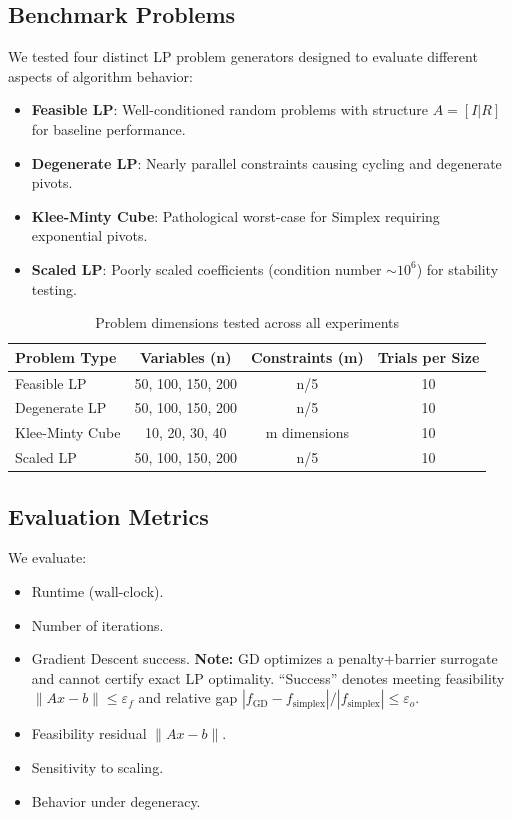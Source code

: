 \documentclass[11pt]{article}
\begin{document}
\subsection{Benchmark Problems}
We tested four distinct LP problem generators designed to evaluate different aspects of algorithm behavior:
\begin{itemize}
    \item \textbf{Feasible LP}: Well-conditioned random problems with structure \(A = [I | R]\) for baseline performance.
    \item \textbf{Degenerate LP}: Nearly parallel constraints causing cycling and degenerate pivots.
    \item \textbf{Klee-Minty Cube}: Pathological worst-case for Simplex requiring exponential pivots.
    \item \textbf{Scaled LP}: Poorly scaled coefficients (condition number \(\sim 10^6\)) for stability testing.
\end{itemize}

\begin{table}[h]
\centering
\caption{Problem dimensions tested across all experiments}
\begin{tabular}{lccc}
\toprule
\textbf{Problem Type} & \textbf{Variables (n)} & \textbf{Constraints (m)} & \textbf{Trials per Size} \\
\midrule
Feasible LP & 50, 100, 150, 200 & n/5 & 10 \\
Degenerate LP & 50, 100, 150, 200 & n/5 & 10 \\
Klee-Minty Cube & 10, 20, 30, 40 & m dimensions & 10 \\
Scaled LP & 50, 100, 150, 200 & n/5 & 10 \\
\bottomrule
\end{tabular}
\end{table}

\subsection{Evaluation Metrics}
We evaluate:
\begin{itemize}
    \item Runtime (wall-clock).
    \item Number of iterations.
    \item Gradient Descent success.
    \textbf{Note:} GD optimizes a penalty+barrier surrogate and cannot certify exact LP optimality. “Success” denotes meeting feasibility \(\|Ax-b\|\le \varepsilon_f\) and relative gap \(|f_{\text{GD}}-f_{\text{simplex}}|/|f_{\text{simplex}}|\le \varepsilon_o\).
    \item Feasibility residual \(\|Ax - b\|\).
    \item Sensitivity to scaling.
    \item Behavior under degeneracy.
\end{itemize}
\end{document}
